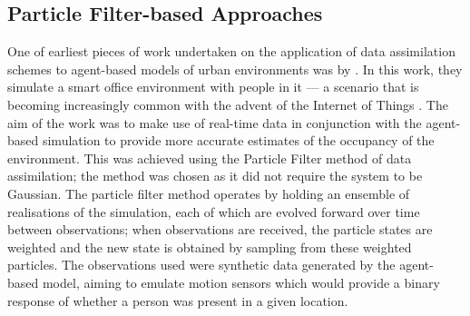 
\subsection{Particle Filter-based Approaches}\label{sub:lit_rev:da_abm:pf}

One of earliest pieces of work undertaken on the application of data
assimilation schemes to agent-based models of urban environments was by
\citet{wang2013data}.
In this work, they simulate a smart office environment with people in it --- a
scenario that is becoming increasingly common with the advent of the Internet of
Things \citep{zanella2014internet}.
The aim of the work was to make use of real-time data in conjunction with the
agent-based simulation to provide more accurate estimates of the occupancy of
the environment.
This was achieved using the Particle Filter method of data assimilation; the
method was chosen as it did not require the system to be Gaussian.
The particle filter method operates by holding an ensemble of realisations of
the simulation, each of which are evolved forward over time between
observations; when observations are received, the particle states are weighted
and the new state is obtained by sampling from these weighted particles.
The observations used were synthetic data generated by the agent-based model,
aiming to emulate motion sensors which would provide a binary response of
whether a person was present in a given location.

